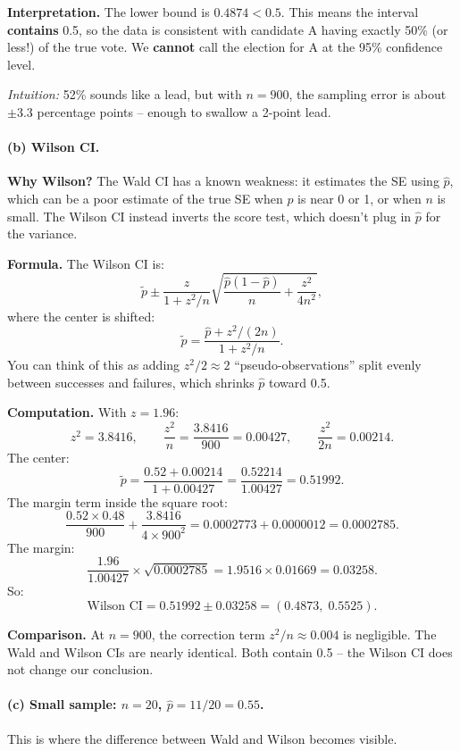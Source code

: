 \documentclass[11pt]{article}
\newcommand{\phat}{\hat{p}}
\begin{document}
\textbf{Interpretation.} The lower bound is $0.4874 < 0.5$. This means the interval \textbf{contains} 0.5, so the data is consistent with candidate A having exactly 50\% (or less!) of the true vote. We \textbf{cannot} call the election for A at the 95\% confidence level.

\textit{Intuition:} 52\% sounds like a lead, but with $n = 900$, the sampling error is about $\pm 3.3$ percentage points -- enough to swallow a 2-point lead.

\paragraph{(b) Wilson CI.}

\textbf{Why Wilson?} The Wald CI has a known weakness: it estimates the SE using $\phat$, which can be a poor estimate of the true SE when $p$ is near 0 or 1, or when $n$ is small. The Wilson CI instead inverts the score test, which doesn't plug in $\phat$ for the variance.

\textbf{Formula.} The Wilson CI is:
\[
  \tilde{p} \pm \frac{z}{1 + z^2/n} \sqrt{\frac{\phat(1-\phat)}{n} + \frac{z^2}{4n^2}},
\]
where the center is shifted:
\[
  \tilde{p} = \frac{\phat + z^2/(2n)}{1 + z^2/n}.
\]
You can think of this as adding $z^2/2 \approx 2$ ``pseudo-observations'' split evenly between successes and failures, which shrinks $\phat$ toward 0.5.

\textbf{Computation.} With $z = 1.96$:
\[
  z^2 = 3.8416, \qquad \frac{z^2}{n} = \frac{3.8416}{900} = 0.00427, \qquad \frac{z^2}{2n} = 0.00214.
\]
The center:
\[
  \tilde{p} = \frac{0.52 + 0.00214}{1 + 0.00427} = \frac{0.52214}{1.00427} = 0.51992.
\]
The margin term inside the square root:
\[
  \frac{0.52 \times 0.48}{900} + \frac{3.8416}{4 \times 900^2}
  = 0.0002773 + 0.0000012
  = 0.0002785.
\]
The margin:
\[
  \frac{1.96}{1.00427} \times \sqrt{0.0002785} = 1.9516 \times 0.01669 = 0.03258.
\]
So:
\[
  \text{Wilson CI} = 0.51992 \pm 0.03258 = \boxed{(0.4873,\; 0.5525)}.
\]

\textbf{Comparison.} At $n = 900$, the correction term $z^2/n \approx 0.004$ is negligible. The Wald and Wilson CIs are nearly identical. Both contain 0.5 -- the Wilson CI does not change our conclusion.

\paragraph{(c) Small sample: $n = 20$, $\phat = 11/20 = 0.55$.}

This is where the difference between Wald and Wilson becomes visible.
\end{document}
